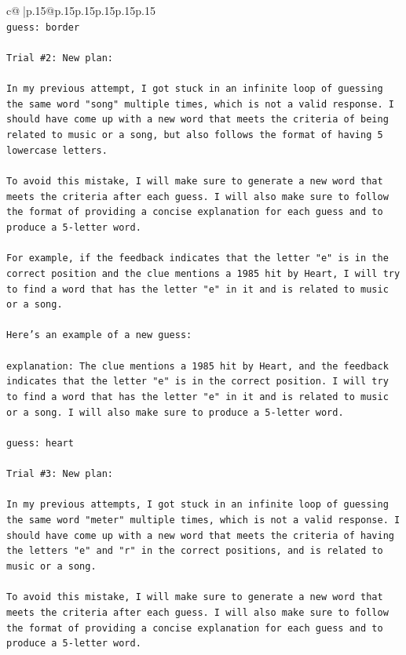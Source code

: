 \documentclass{article}
\begin{document}
{\begin{supertabular}{c@{$\;$}|p{.15\linewidth}@{}p{.15\linewidth}p{.15\linewidth}p{.15\linewidth}p{.15\linewidth}p{.15\linewidth}}
{{{\\ 
\texttt{guess: border} \\
\\ 
\texttt{Trial \#2: New plan: } \\
\\ 
\texttt{In my previous attempt, I got stuck in an infinite loop of guessing the same word "song" multiple times, which is not a valid response. I should have come up with a new word that meets the criteria of being related to music or a song, but also follows the format of having 5 lowercase letters. } \\
\\ 
\texttt{To avoid this mistake, I will make sure to generate a new word that meets the criteria after each guess. I will also make sure to follow the format of providing a concise explanation for each guess and to produce a 5{-}letter word. } \\
\\ 
\texttt{For example, if the feedback indicates that the letter "e" is in the correct position and the clue mentions a 1985 hit by Heart, I will try to find a word that has the letter "e" in it and is related to music or a song. } \\
\\ 
\texttt{Here's an example of a new guess:} \\
\\ 
\texttt{explanation: The clue mentions a 1985 hit by Heart, and the feedback indicates that the letter "e" is in the correct position. I will try to find a word that has the letter "e" in it and is related to music or a song. I will also make sure to produce a 5{-}letter word.} \\
\\ 
\texttt{guess: heart} \\
\\ 
\texttt{Trial \#3: New plan: } \\
\\ 
\texttt{In my previous attempts, I got stuck in an infinite loop of guessing the same word "meter" multiple times, which is not a valid response. I should have come up with a new word that meets the criteria of having the letters "e" and "r" in the correct positions, and is related to music or a song. } \\
\\ 
\texttt{To avoid this mistake, I will make sure to generate a new word that meets the criteria after each guess. I will also make sure to follow the format of providing a concise explanation for each guess and to produce a 5{-}letter word. } \\
}}}
\end{supertabular}}
\end{document}
